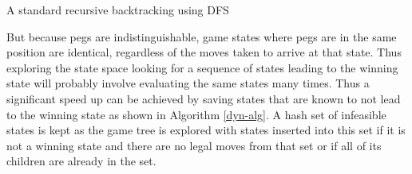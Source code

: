 \documentclass[12pt,a4paper]{report}
\begin{document}
\begin{algorithm}[H]
	\DontPrintSemicolon
  \label{standard-dfs}
	\caption{A standard recursive backtracking using DFS}
\end{algorithm}
But because pegs are indistinguishable, game states where pegs are in the same position are identical, regardless of the moves taken to arrive at that state. Thus exploring the state space looking for a sequence of states leading to the winning state will probably involve evaluating the same states many times. Thus a significant speed up can be achieved by saving states that are known to not lead to the winning state as shown in Algorithm \autoref{dyn-alg}. A hash set of infeasible states is kept as the game tree is explored with states inserted into this set if it is not a winning state and there are no legal moves from that set or if all of its children are already in the set.
\end{document}
